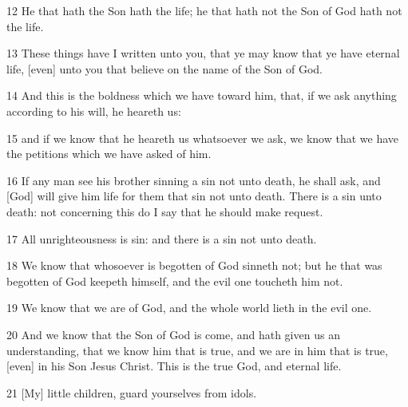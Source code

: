 \par 12 He that hath the Son hath the life; he that hath not the Son of God hath not the life.
\par 13 These things have I written unto you, that ye may know that ye have eternal life, [even] unto you that believe on the name of the Son of God.
\par 14 And this is the boldness which we have toward him, that, if we ask anything according to his will, he heareth us:
\par 15 and if we know that he heareth us whatsoever we ask, we know that we have the petitions which we have asked of him.
\par 16 If any man see his brother sinning a sin not unto death, he shall ask, and [God] will give him life for them that sin not unto death. There is a sin unto death: not concerning this do I say that he should make request.
\par 17 All unrighteousness is sin: and there is a sin not unto death.
\par 18 We know that whosoever is begotten of God sinneth not; but he that was begotten of God keepeth himself, and the evil one toucheth him not.
\par 19 We know that we are of God, and the whole world lieth in the evil one.
\par 20 And we know that the Son of God is come, and hath given us an understanding, that we know him that is true, and we are in him that is true, [even] in his Son Jesus Christ. This is the true God, and eternal life.
\par 21 [My] little children, guard yourselves from idols.

